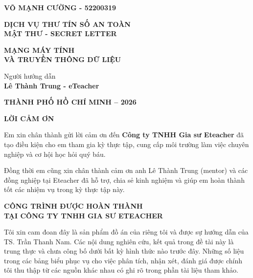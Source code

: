 \documentclass[13pt,a4paper]{extreport}
\begin{document}
\begin{center}
    \fontsize{18pt}{18pt}\selectfont
    \textbf{VÕ MẠNH CƯỜNG - 52200319}
\end{center}
\vspace{1cm}
\begin{center}\Huge
    \textbf{\MakeUppercase{Dịch vụ thư tín số an toàn\\Mật thư - Secret Letter}}	
\end{center}
\vspace{1cm}
\begin{center}
\fontsize{20pt}{18pt}\selectfont
    \textbf{\MakeUppercase{MẠNG MÁY TÍNH\\VÀ TRUYỀN THÔNG DỮ LIỆU}} 
\end{center}

\vspace{1.5cm}
\fontsize{16pt}{16pt}\selectfont
\begin{center}
    Người hướng dẫn\\
    \fontsize{18pt}{16pt}\selectfont
    \textbf{Lê Thành Trung - eTeacher}
\end{center}
\vspace{1cm}
\begin{center}
    \textbf{THÀNH PHỐ HỒ CHÍ MINH – 2026}
\end{center}
\clearpage

\pagestyle{plain}
\setcounter{page}{1}
\fontsize{15pt}{18pt}\selectfont
\begin{center}\fontsize{16pt}{18pt}
    \textbf{LỜI CẢM ƠN}	
\end{center}
Em xin chân thành gửi lời cảm ơn đến \textbf{Công ty TNHH Gia sư Eteacher} đã tạo điều kiện cho em tham gia kỳ thực tập, cung cấp môi trường làm việc chuyên nghiệp và cơ hội học hỏi quý báu. 

Đồng thời em cũng xin chân thành cảm ơn anh Lê Thành Trung (mentor) và các đồng nghiệp tại Eteacher đã hỗ trợ, chia sẻ kinh nghiệm và giúp em hoàn thành tốt các nhiệm vụ trong kỳ thực tập này.


\newpage

\begin{center}\fontsize{16pt}{18pt}
    \textbf{CÔNG TRÌNH ĐƯỢC HOÀN THÀNH \\ TẠI CÔNG TY TNHH GIA SƯ ETEACHER}
\end{center}

Tôi xin cam đoan đây là sản phẩm đồ án của riêng tôi và được sự hướng dẫn của TS. Trần Thanh Nam. Các nội dung nghiên cứu, kết quả trong đề tài này là trung thực và chưa công bố dưới bất kỳ hình thức nào trước đây. Những số liệu trong các bảng biểu phục vụ cho việc phân tích, nhận xét, đánh giá được chính tôi thu thập từ các nguồn khác nhau có ghi rõ trong phần tài liệu tham khảo.
\end{document}

